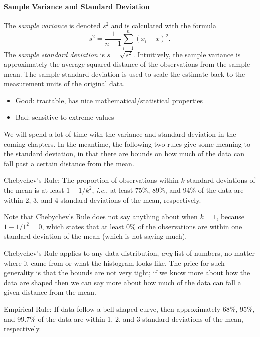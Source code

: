 \documentclass[captions=tableheading]{scrbook}
\begin{document}
\label{sub:Measures-of-Spread}

\paragraph*{Sample Variance and Standard Deviation}

The \emph{sample variance} is denoted \(s^{2}\) and is calculated with the formula
\begin{equation}
s^{2}=\frac{1}{n-1}\sum_{i=1}^{n}(x_{i}-\overline{x})^{2}.
\end{equation}
The \emph{sample standard deviation} is \(s=\sqrt{s^{2}}\). Intuitively, the sample variance is approximately the average squared distance of the observations from the sample mean. The sample standard deviation is used to scale the estimate back to the measurement units of the original data.
\begin{itemize}
\item Good: tractable, has nice mathematical/statistical properties
\item Bad: sensitive to extreme values
\end{itemize}
We will spend a lot of time with the variance and standard deviation in the coming chapters. In the meantime, the following two rules give some meaning to the standard deviation, in that there are bounds on how much of the data can fall past a certain distance from the mean.

\begin{fact}
Chebychev's Rule: The proportion of observations within \(k\) standard deviations of the mean is at least \(1-1/k^{2}\), \emph{i.e.}, at least 75\%, 89\%, and 94\% of the data are within 2, 3, and 4 standard deviations of the mean, respectively.
\end{fact}

Note that Chebychev's Rule does not say anything about when \(k=1\), because \(1-1/1^{2}=0\), which states that at least 0\% of the observations are within one standard deviation of the mean (which is not saying much).

Chebychev's Rule applies to any data distribution, \emph{any} list of numbers, no matter where it came from or what the histogram looks like. The price for such generality is that the bounds are not very tight; if we know more about how the data are shaped then we can say more about how much of the data can fall a given distance from the mean.

\begin{fact}
\label{fac:Empirical-Rule}
Empirical Rule: If data follow a bell-shaped curve, then approximately 68\%, 95\%, and 99.7\% of the data are within 1, 2, and 3 standard deviations of the mean, respectively. 
\end{fact}
\end{document}
